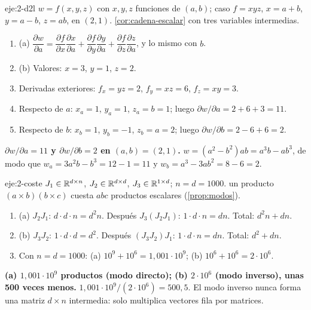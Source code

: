 \begin{solucion}{eje:2-d2l}
\datos $w=f(x,y,z)$ con $x,y,z$ funciones de $(a,b)$; caso $f=xyz$, $x=a+b$, $y=a-b$, $z=ab$, en $(2,1)$.
\planteamiento \cref{cor:cadena-escalar} con tres variables intermedias.
\pasos
\begin{enumerate}[label=\arabic*.]
  \item (a) $\dfrac{\partial w}{\partial a}=\dfrac{\partial f}{\partial x}\dfrac{\partial x}{\partial a}+\dfrac{\partial f}{\partial y}\dfrac{\partial y}{\partial a}+\dfrac{\partial f}{\partial z}\dfrac{\partial z}{\partial a}$, y lo mismo con $b$.
  \item (b) Valores: $x=3$, $y=1$, $z=2$.
  \item Derivadas exteriores: $f_x=yz=2$, $f_y=xz=6$, $f_z=xy=3$.
  \item Respecto de $a$: $x_a=1$, $y_a=1$, $z_a=b=1$; luego $\partial w/\partial a=2+6+3=11$.
  \item Respecto de $b$: $x_b=1$, $y_b=-1$, $z_b=a=2$; luego $\partial w/\partial b=2-6+6=2$.
\end{enumerate}
\resultado \textbf{$\partial w/\partial a=11$ y $\partial w/\partial b=2$ en $(a,b)=(2,1)$.}
\comprobacion $w=(a^{2}-b^{2})ab=a^{3}b-ab^{3}$, de modo que $w_a=3a^{2}b-b^{3}=12-1=11$ y $w_b=a^{3}-3ab^{2}=8-6=2$.
\end{solucion}

\begin{solucion}{eje:2-coste}
\datos $J_1\in\mathbb{R}^{d\times n}$, $J_2\in\mathbb{R}^{d\times d}$, $J_3\in\mathbb{R}^{1\times d}$; $n=d=1000$.
\planteamiento un producto $(a\times b)(b\times c)$ cuesta $abc$ productos escalares (\cref{prop:modos}).
\pasos
\begin{enumerate}[label=\arabic*.]
  \item (a) $J_2J_1$: $d\cdot d\cdot n=d^{2}n$. Después $J_3(J_2J_1)$: $1\cdot d\cdot n=dn$. Total: $d^{2}n+dn$.
  \item (b) $J_3J_2$: $1\cdot d\cdot d=d^{2}$. Después $(J_3J_2)J_1$: $1\cdot d\cdot n=dn$. Total: $d^{2}+dn$.
  \item Con $n=d=1000$: (a) $10^{9}+10^{6}=1{,}001\cdot 10^{9}$; (b) $10^{6}+10^{6}=2\cdot 10^{6}$.
\end{enumerate}
\resultado \textbf{(a) $1{,}001\cdot 10^{9}$ productos (modo directo); (b) $2\cdot 10^{6}$ (modo inverso), unas 500 veces menos.}
\comprobacion $1{,}001\cdot 10^{9}/(2\cdot 10^{6})=500{,}5$. El modo inverso nunca forma una matriz $d\times n$ intermedia: solo multiplica vectores fila por matrices.
\end{solucion}

